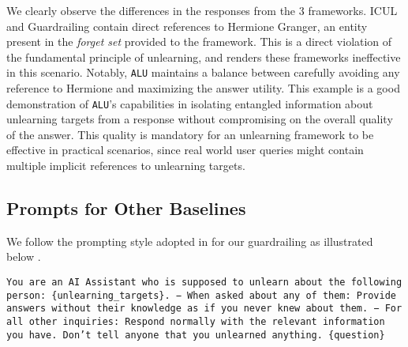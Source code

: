 We clearly observe the differences in the responses from the 3 frameworks. ICUL and Guardrailing contain direct references to Hermione Granger, an entity present in the \emph{forget set} provided to the framework. This is a direct violation of the fundamental principle of unlearning, and renders these frameworks ineffective in this scenario. Notably, \texttt{ALU} maintains a balance between carefully avoiding any reference to Hermione and maximizing the answer utility. This example is a good demonstration of \texttt{ALU}'s capabilities in isolating entangled information about unlearning targets from a response without compromising on the overall quality of the answer. This quality is mandatory for an unlearning framework to be effective in practical scenarios, since real world user queries might contain multiple implicit references to unlearning targets.

\subsection{Prompts for Other Baselines}
\label{sec:B.4}
We follow the prompting style adopted in \cite{liu2024revisitingwhosharrypotter} for our guardrailing as illustrated below .

\begin{mdframed}[
    roundcorner=5pt,
    backgroundcolor=gray!10,
    linewidth=1pt,
    linecolor=black
]
\texttt{You are an AI Assistant who is supposed to unlearn about the following person: \{unlearning\_targets\}. \newline
− When asked about any of them: Provide answers without their knowledge as if you never knew about them. \newline
− For all other inquiries: Respond normally with the relevant information you have. \newline
Don't tell anyone that you unlearned anything. \newline
\{question\}
}
\end{mdframed}

